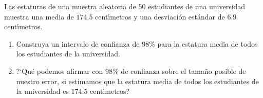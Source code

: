 \begin{enunciado}
 Las estaturas de una muestra aleatoria de $50$ estudiantes de una universidad muestra una media de $174.5$ cent\'{\i}metros y una desviaci\'on est\'andar de $6.9$ cent\'{\i}metros.
 \begin{enumerate}
  \item Construya un intervalo de confianza de $98\%$ para la estatura media de todos los estudiantes de la universidad.

  \item ?`Qu\'e podemos afirmar con $98\%$ de confianza sobre el tama\~no posible de nuestro error, si estimamos que la estatura media de todos los estudiantes de la universidad es $174.5$ cent\'{\i}metros?
 \end{enumerate}
\end{enunciado}

